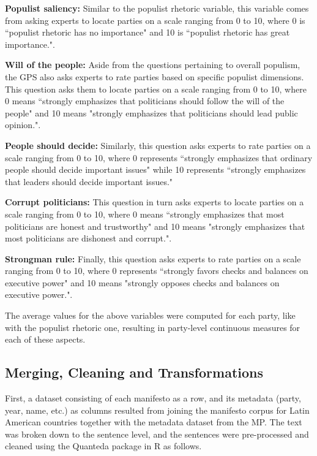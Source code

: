 \documentclass[12pt,letterpaper]{article}
\begin{document}
\textbf{Populist saliency:} Similar to the populist rhetoric variable, this variable comes from asking experts to locate parties on a scale ranging from 0 to 10, where 0 is ``populist rhetoric has no importance" and 10 is ``populist rhetoric has great importance.".

\textbf{Will of the people:} Aside from the questions pertaining to overall populism, the GPS also asks experts to rate parties based on specific populist dimensions. This question asks them to locate parties on a scale ranging from 0 to 10, where 0 means ``strongly emphasizes that politicians should follow the will of the people" and 10 means "strongly emphasizes that politicians should lead public opinion.".

\textbf{People should decide:} Similarly, this question asks experts to rate parties on a scale ranging from 0 to 10, where 0 represents ``strongly emphasizes that ordinary people should decide important issues" while 10 represents ``strongly emphasizes that leaders should decide important issues."

\textbf{Corrupt politicians:} This question in turn asks experts to locate parties on a scale ranging from 0 to 10, where 0 means ``strongly emphasizes that most politicians are honest and trustworthy" and 10 means "strongly emphasizes that most politicians are dishonest and corrupt.".

\textbf{Strongman rule:} Finally, this question asks experts to rate parties on a scale ranging from 0 to 10, where 0 represents ``strongly favors checks and balances on executive power" and 10 means "strongly opposes checks and balances on executive power.".

The average values for the above variables were computed for each party, like with the populist rhetoric one, resulting in party-level continuous measures for each of these aspects.

\vspace{.25cm}
\subsection{Merging, Cleaning and Transformations}

\vspace{.25cm}
\noindent First, a dataset consisting of each manifesto as a row, and its metadata (party, year, name, etc.) as columns resulted from joining the manifesto corpus for Latin American countries together with the metadata dataset from the MP. The text was broken down to the sentence level, and the sentences were pre-processed and cleaned using the Quanteda package in R as follows.
\end{document}
